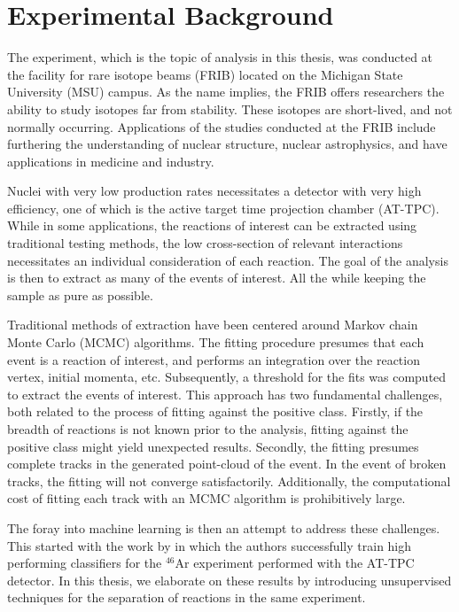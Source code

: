 \chapter{Experimental Background}\label{ch:experimental}

The experiment, which is the topic of analysis in this thesis, was conducted at the facility for rare isotope beams (FRIB) located on the Michigan State University (MSU) campus. As the name implies, the FRIB offers researchers the ability to study isotopes far from stability. These isotopes are short-lived, and not normally occurring. Applications of the studies conducted at the FRIB include furthering the understanding of nuclear structure, nuclear astrophysics, and have applications in medicine and industry. 

Nuclei with very low production rates necessitates a detector with very high efficiency, one of which is the active target time projection chamber (AT-TPC). While in some applications, the reactions of interest can be extracted using traditional testing methods, the low cross-section of relevant interactions necessitates an individual consideration of each reaction. The goal of the analysis is then to extract as many of the events of interest. All the while keeping the sample as pure as possible. 

Traditional methods of extraction have been centered around Markov chain Monte Carlo (MCMC) algorithms. The fitting procedure presumes that each event is a reaction of interest, and performs an integration over the reaction vertex, initial momenta, etc. Subsequently, a threshold for the fits was computed to extract the events of interest. This approach has two fundamental challenges, both related to the process of fitting against the positive class. Firstly, if the breadth of reactions is not known prior to the analysis, fitting against the positive class might yield unexpected results. Secondly, the fitting presumes complete tracks in the generated point-cloud of the event. In the event of broken tracks, the fitting will not converge satisfactorily. Additionally, the computational cost of fitting each track with an MCMC algorithm is prohibitively large. 

The foray into machine learning is then an attempt to address these challenges. This started with the work by \cite{Kuchera2019} in which the authors successfully train high performing classifiers for the ${}^{46}$Ar experiment performed with the AT-TPC detector. In this thesis, we elaborate on these results by introducing unsupervised techniques for the separation of reactions in the same experiment.